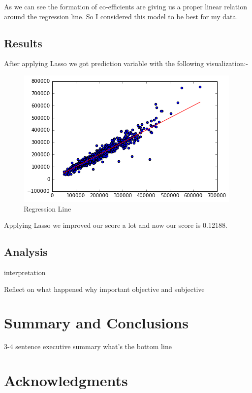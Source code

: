 \documentclass[fleqn,10pt]{SelfArx} %
\begin{document}
As we can see the formation of co-efficients are giving us a proper linear relation around the regression line. So I considered this model to be best for my data. 

\subsection{Results}

After applying Lasso we got prediction variable with the following visualization:- 
\begin{figure}[ht]\centering %
\includegraphics[width=\linewidth]{Figure2}
\caption{Regression Line}
\label{fig:Figure2}
\end{figure}

Applying Lasso we improved our score a lot and now our score is 0.12188.

\subsection{Analysis}

interpretation

Reflect on what happened
why important
objective and subjective


\section{Summary and Conclusions}

3-4 sentence executive summary
what's the bottom line

\section*{Acknowledgments} %
\end{document}
